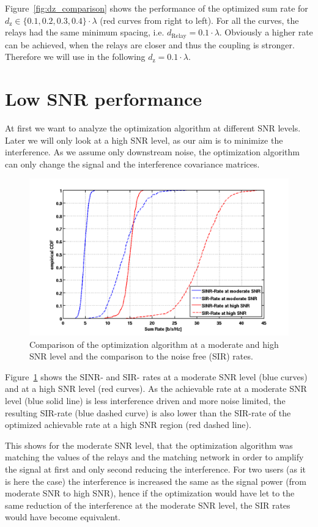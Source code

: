 Figure~\ref{fig:dz_comparison} shows the performance of the optimized sum rate for $d_\text{z}\in\{0.1,0.2,0.3,0.4\}\cdot\lambda$ (red curves from right to left).
For all the curves, the relays had the same minimum spacing, i.e. $d_\text{Relay}=0.1\cdot\lambda$.
Obviously a higher rate can be achieved, when the relays are closer and thus the coupling is stronger.
Therefore we will use in the following $d_\text{z}=0.1\cdot\lambda$.


\section{Low SNR performance}
\label{sec:low_snr}

At first we want to analyze the optimization algorithm at different SNR levels.
Later we will only look at a high SNR level, as our aim is to minimize the interference.
As we assume only downstream noise, the optimization algorithm can only change the signal and the interference covariance matrices.
\begin{figure}[h]
\centering
  \includegraphics[width=0.9\linewidth]{images/Comparison_modvshighSNR.png}
\caption{Comparison of the optimization algorithm at a moderate and high SNR level and the comparison to the noise free (SIR) rates.}
\label{fig:snrcomparison}
\end{figure}

Figure~\ref{fig:snrcomparison} shows the SINR- and SIR- rates at a moderate SNR level (blue curves) and at a high SNR level (red curves).
As the achievable rate at a moderate SNR level (blue solid line) is less interference driven and more noise limited, the resulting SIR-rate (blue dashed curve) is also lower than the SIR-rate of the optimized achievable rate at a high SNR region (red dashed line).

This shows for the moderate SNR level, that the optimization algorithm was matching the values of the relays and the matching network in order to amplify the signal at first and only second reducing the interference.
For two users (as it is here the case) the interference is increased the same as the signal power (from moderate SNR to high SNR), hence if the optimization would have let to the same reduction of the interference at the moderate SNR level, the SIR rates would have become equivalent.

